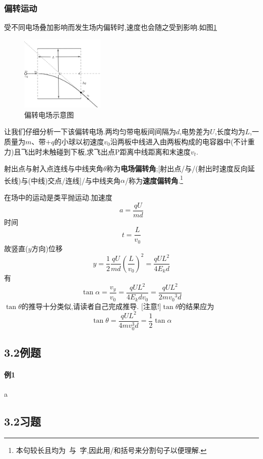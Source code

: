 \subsubsection{偏转运动}
受不同电场叠加影响而发生场内偏转时,速度也会随之受到影响.如图\ref{pzdc}\begin{figure}[htp]\centering\includegraphics[width=4cm]{11-2}\caption[偏转电场示意图]{偏转电场示意图}\label{pzdc} \end{figure}\newpage


让我们仔细分析一下该偏转电场.两均匀带电板间间隔为$d$,电势差为$U$,长度均为$L$,一质量为$m$、带$+q$的小球以初速度$v_0$沿两板中线进入由两板构成的电容器中(不计重力)且飞出时未触碰到下板,求飞出点P距离中线距离和末速度$v_t$.
\begin{de}射出点与射入点连线与中线夹角$\theta$称为\textbf{电场偏转角};[射出点/与/(射出时速度反向延长线)与(中线)交点/连线]/与中线夹角$\alpha$/称为\textbf{速度偏转角}.\footnote{本句较长且均为\ 与\ 字,因此用/和括号来分割句子以便理解.}\end{de}


在场中的运动是类平抛运动.加速度\begin{equation*}a=\dfrac{qU}{md}\end{equation*} 时间\begin{equation*}
	t=\dfrac{L}{v_0}
\end{equation*}
 故竖直($y$方向)位移\begin{equation*}y=\dfrac{1}{2}\dfrac{qU}{md}({\dfrac{L}{v_0}})^2=\dfrac{qUL^2}{4E_{k}d}\end{equation*}
有\begin{equation*}
	\tan\alpha=\dfrac{v_y}{v_0}=\dfrac{qUL^2}{4E_kdv_0}=\dfrac{qUL^2}{2m{v_0}^3d} 
\end{equation*}
$\tan\theta$的推导十分类似,请读者自己完成推导.
[注意!]$\tan\theta$的结果应为\begin{equation*}\tan\theta=\dfrac{qUL^2}{4mv_0^3d}=\dfrac{1}{2}\tan\alpha\end{equation*}
\subsection{3.2例题}
\paragraph{例1}\qquad a
\subsection{3.2习题}